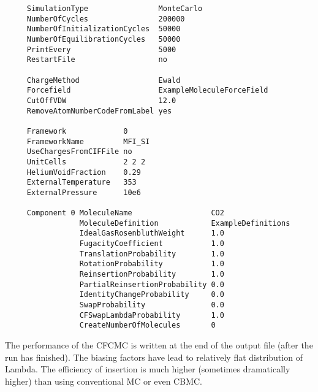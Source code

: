 \begin{tiny}
\begin{verbatim}
     SimulationType                MonteCarlo
     NumberOfCycles                200000
     NumberOfInitializationCycles  50000
     NumberOfEquilibrationCycles   50000
     PrintEvery                    5000
     RestartFile                   no

     ChargeMethod                  Ewald
     Forcefield                    ExampleMoleculeForceField
     CutOffVDW                     12.0
     RemoveAtomNumberCodeFromLabel yes

     Framework             0
     FrameworkName         MFI_SI
     UseChargesFromCIFFile no
     UnitCells             2 2 2
     HeliumVoidFraction    0.29
     ExternalTemperature   353
     ExternalPressure      10e6

     Component 0 MoleculeName                  CO2
                 MoleculeDefinition            ExampleDefinitions
                 IdealGasRosenbluthWeight      1.0
                 FugacityCoefficient           1.0
                 TranslationProbability        1.0
                 RotationProbability           1.0
                 ReinsertionProbability        1.0
                 PartialReinsertionProbability 0.0
                 IdentityChangeProbability     0.0
                 SwapProbability               0.0
                 CFSwapLambdaProbability       1.0
                 CreateNumberOfMolecules       0
\end{verbatim}
\end{tiny}

The performance of the CFCMC is written at the end of the output file (after the run has finished).
The biasing factors have lead to relatively flat distribution of Lambda. The efficiency of insertion is
much higher (sometimes dramatically higher) than using conventional MC or even CBMC.

